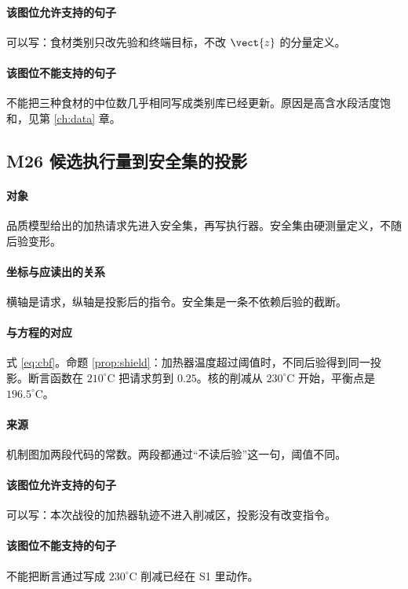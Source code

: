 \paragraph{该图位允许支持的句子}
可以写：食材类别只改先验和终端目标，不改 $\vect{z}$ 的分量定义。

\paragraph{该图位不能支持的句子}
不能把三种食材的中位数几乎相同写成类别库已经更新。原因是高含水段活度饱和，见第 \ref{ch:data} 章。

\subsection{M26 候选执行量到安全集的投影}
\paragraph{对象}
品质模型给出的加热请求先进入安全集，再写执行器。安全集由硬测量定义，不随后验变形。

\paragraph{坐标与应读出的关系}
横轴是请求，纵轴是投影后的指令。安全集是一条不依赖后验的截断。

\paragraph{与方程的对应}
式 \eqref{eq:cbf}。命题 \ref{prop:shield}：加热器温度超过阈值时，不同后验得到同一投影。断言函数在 $210^\circ\mathrm{C}$ 把请求剪到 $0.25$。核的削减从 $230^\circ\mathrm{C}$ 开始，平衡点是 $196.5^\circ\mathrm{C}$。

\paragraph{来源}
机制图加两段代码的常数。两段都通过“不读后验”这一句，阈值不同。

\paragraph{该图位允许支持的句子}
可以写：本次战役的加热器轨迹不进入削减区，投影没有改变指令。

\paragraph{该图位不能支持的句子}
不能把断言通过写成 $230^\circ\mathrm{C}$ 削减已经在 S1 里动作。

